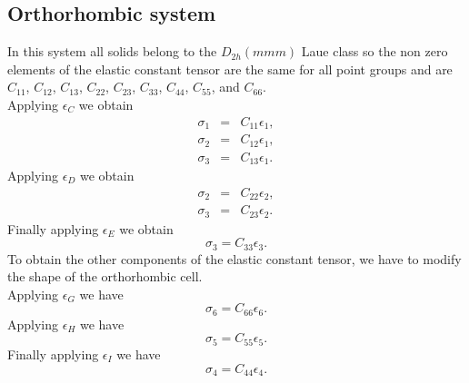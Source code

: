 \documentclass[12pt,a4paper,twoside]{report}
\begin{document}
{\color{web-blue}\subsection{Orthorhombic system}}
\color{black}

In this system all solids belong to the $D_{2h} (mmm)$ Laue class so
the non zero elements of the elastic constant tensor are the same for all 
point groups and are
$C_{11}$, $C_{12}$, $C_{13}$, $C_{22}$, $C_{23}$,
$C_{33}$, $C_{44}$, $C_{55}$, and $C_{66}$. \\
Applying $\epsilon_C$ we obtain
\begin{eqnarray}
\sigma_1&=&C_{11} \epsilon_1,  \\
\sigma_2&=&C_{12} \epsilon_1,  \\
\sigma_3&=&C_{13} \epsilon_1.
\end{eqnarray}
Applying $\epsilon_D$ we obtain
\begin{eqnarray}
\sigma_2&=&C_{22} \epsilon_2,  \\
\sigma_3&=&C_{23} \epsilon_2.
\end{eqnarray}
Finally applying $\epsilon_E$ we obtain
\begin{equation}
\sigma_3=C_{33} \epsilon_3.
\end{equation}
To obtain the other components of the elastic constant tensor,
we have to modify the shape of the orthorhombic cell. \\
Applying $\epsilon_G$ we have
\begin{equation}
\sigma_6=C_{66} \epsilon_6.
\end{equation}
Applying $\epsilon_H$ we have
\begin{equation}
\sigma_5=C_{55} \epsilon_5.
\end{equation}
Finally applying $\epsilon_I$ we have
\begin{equation}
\sigma_4=C_{44} \epsilon_4.
\end{equation}
\end{document}
